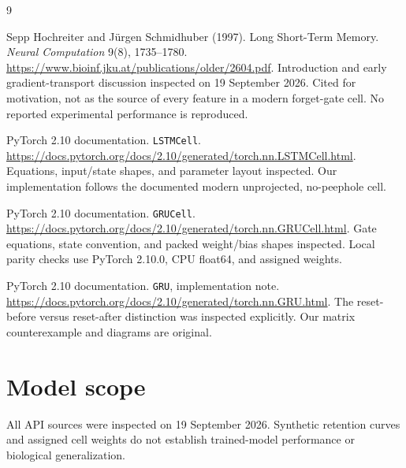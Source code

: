 \renewcommand{\bibname}{Sources and reading notes}
\begin{thebibliography}{9}
Sepp Hochreiter and Jürgen Schmidhuber (1997). Long Short-Term Memory.
\emph{Neural Computation} 9(8), 1735--1780.
\url{https://www.bioinf.jku.at/publications/older/2604.pdf}.
Introduction and early gradient-transport discussion inspected on
19 September 2026. Cited for motivation, not as the source of every feature
in a modern forget-gate cell. No reported experimental performance is reproduced.

PyTorch 2.10 documentation. \texttt{LSTMCell}.
\url{https://docs.pytorch.org/docs/2.10/generated/torch.nn.LSTMCell.html}.
Equations, input/state shapes, and parameter layout inspected.
Our implementation follows the documented modern unprojected, no-peephole cell.

PyTorch 2.10 documentation. \texttt{GRUCell}.
\url{https://docs.pytorch.org/docs/2.10/generated/torch.nn.GRUCell.html}.
Gate equations, state convention, and packed weight/bias shapes inspected.
Local parity checks use PyTorch 2.10.0, CPU float64, and assigned weights.

PyTorch 2.10 documentation. \texttt{GRU}, implementation note.
\url{https://docs.pytorch.org/docs/2.10/generated/torch.nn.GRU.html}.
The reset-before versus reset-after distinction was inspected explicitly.
Our matrix counterexample and diagrams are original.
\end{thebibliography}

\section*{Model scope}
All API sources were inspected on 19 September 2026.
Synthetic retention curves and assigned cell weights do not establish
trained-model performance or biological generalization.
